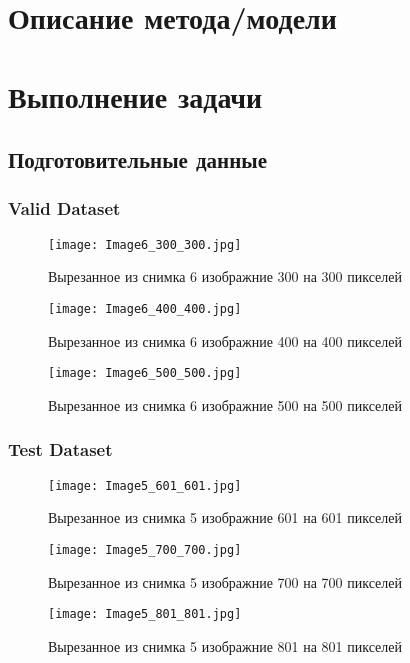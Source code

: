 \documentclass[12pt, a4paper]{report}
\begin{document}
	\newpage

	\section*{Описание метода/модели}
	\large

	\newpage

	\section*{Выполнение задачи}

	\newpage
	\vfill

	\subsection*{Подготовительные данные}
	\large

	\subsubsection*{Valid Dataset}
	\large
	\begin{figure}[h]
		\texttt{[image: Image6\_300\_300.jpg]}
		\caption{Вырезанное из снимка 6 изображние 300 на 300 пикселей}
	\end{figure}
	\begin{figure}
		\texttt{[image: Image6\_400\_400.jpg]}
		\caption{Вырезанное из снимка 6 изображние 400 на 400 пикселей}
	\end{figure}
	\begin{figure}
		\texttt{[image: Image6\_500\_500.jpg]}
		\caption{Вырезанное из снимка 6 изображние 500 на 500 пикселей}
	\end{figure}

	\newpage

	\subsubsection*{Test Dataset}
	\large
	\begin{figure}[h]
		\texttt{[image: Image5\_601\_601.jpg]}
		\caption{Вырезанное из снимка 5 изображние 601 на 601 пикселей}
	\end{figure}
	\begin{figure}
		\texttt{[image: Image5\_700\_700.jpg]}
		\caption{Вырезанное из снимка 5 изображние 700 на 700 пикселей}
	\end{figure}
	\begin{figure}
		\texttt{[image: Image5\_801\_801.jpg]}
		\caption{Вырезанное из снимка 5 изображние 801 на 801 пикселей}
	\end{figure}
\end{document}
